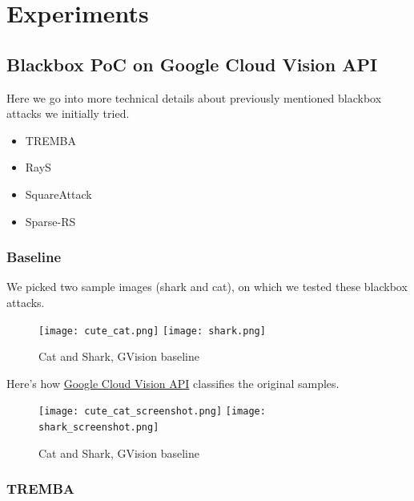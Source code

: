 \chapter{Experiments}
\label{experiments_chap}

\section{Blackbox PoC on Google Cloud Vision API}
Here we go into more technical details about previously mentioned blackbox attacks we initially tried.

\begin{itemize}
    \item TREMBA
    \item RayS
    \item SquareAttack
    \item Sparse-RS
\end{itemize}

\subsection{Baseline}
We picked two sample images (shark and cat), on which we tested these blackbox attacks.

\begin{figure}[!htb]
\null\hspace{1cm}
  \texttt{[image: cute\_cat.png]}
\endminipage
\null\hspace{1cm}
  \texttt{[image: shark.png]}
\endminipage
\caption{Cat and Shark, GVision baseline}
\label{fig:cat_shark_original}
\end{figure}


Here's how \href{https://cloud.google.com/vision}{Google Cloud Vision API} classifies the original samples.

\begin{figure}[!htb]
  \texttt{[image: cute\_cat\_screenshot.png]}
\endminipage\hfill
{}
  \texttt{[image: shark\_screenshot.png]}
\endminipage\hfill
\caption{Cat and Shark, GVision baseline}
\label{fig:cat_shark_gvision_baseline}
\end{figure}

\subsection{TREMBA}

